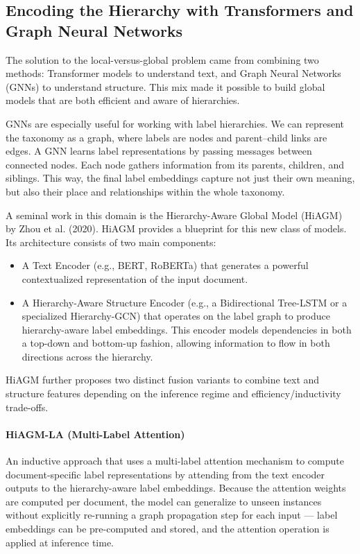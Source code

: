\subsection{Encoding the Hierarchy with Transformers and Graph Neural Networks}

The solution to the local-versus-global problem came from combining two methods: Transformer models to understand text, and Graph Neural Networks (GNNs) to understand structure. This mix made it possible to build global models that are both efficient and aware of hierarchies. \cite{wang2024graphneuralnetworkstext, zhou-etal-2020-hierarchy}

GNNs are especially useful for working with label hierarchies. \cite{li2021heterogeneous} We can represent the taxonomy as a graph, where labels are nodes and parent–child links are edges. A GNN learns label representations by passing messages between connected nodes. Each node gathers information from its parents, children, and siblings. This way, the final label embeddings capture not just their own meaning, but also their place and relationships within the whole taxonomy.

A seminal work in this domain is the Hierarchy-Aware Global Model (HiAGM) by Zhou et al. (2020). HiAGM provides a blueprint for this new class of models. Its architecture consists of two main components:~\cite{zhou-etal-2020-hierarchy}

\begin{itemize}
	\item A Text Encoder (e.g., BERT, RoBERTa) that generates a powerful contextualized representation of the input document.
	\item A Hierarchy-Aware Structure Encoder (e.g., a Bidirectional Tree-LSTM or a specialized Hierarchy-GCN) that operates on the label graph to produce hierarchy-aware label embeddings. This encoder models dependencies in both a top-down and bottom-up fashion, allowing information to flow in both directions across the hierarchy.
\end{itemize}

HiAGM further proposes two distinct fusion variants to combine text and structure features depending on the inference regime and efficiency/inductivity trade-offs.

\paragraph{HiAGM-LA (Multi-Label Attention)}
An inductive approach that uses a multi-label attention mechanism to compute document-specific label representations by attending from the text encoder outputs to the hierarchy-aware label embeddings. Because the attention weights are computed per document, the model can generalize to unseen instances without explicitly re-running a graph propagation step for each input — label embeddings can be pre-computed and stored, and the attention operation is applied at inference time.

